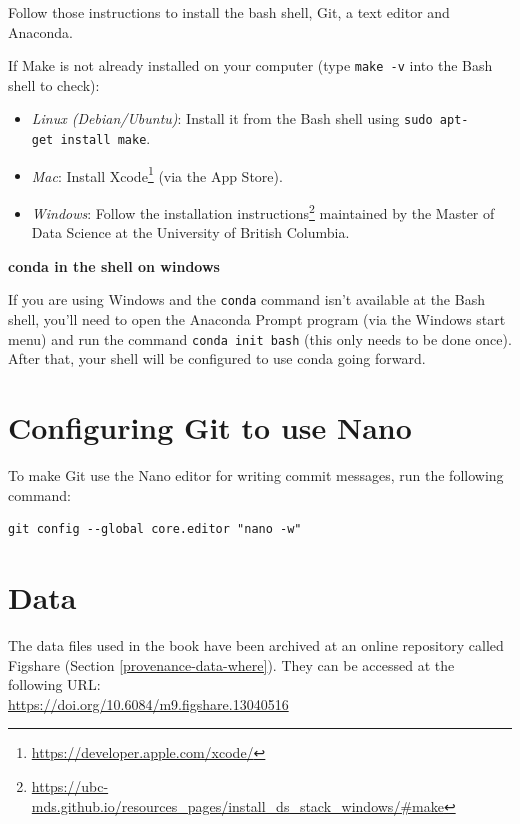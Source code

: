 \documentclass[
]{krantz}
\providecommand{\tightlist}{%
  \setlength{\itemsep}{0pt}\setlength{\parskip}{0pt}}
\renewenvironment{quote}{\begin{VF}}{\end{VF}}
\renewcommand{\href}[2]{#2\footnote{\url{#1}}}
\begin{document}
Follow those instructions to install the bash shell, Git, a text editor and Anaconda.

If Make is not already installed on your computer (type \texttt{make\ -v} into the Bash shell to check):

\begin{itemize}
\tightlist
\item
  \emph{Linux (Debian/Ubuntu)}: Install it from the Bash shell using \texttt{sudo\ apt-get\ install\ make}.
\item
  \emph{Mac}: Install \href{https://developer.apple.com/xcode/}{Xcode} (via the App Store).
\item
  \emph{Windows}: Follow the \href{https://ubc-mds.github.io/resources_pages/install_ds_stack_windows/\#make}{installation instructions} maintained by the
  Master of Data Science at the University of British Columbia.
\end{itemize}

\begin{quote}
\textbf{conda in the shell on windows}

If you are using Windows and the \texttt{conda} command isn't available at the Bash shell,
you'll need to open the Anaconda Prompt program (via the Windows start menu)
and run the command \texttt{conda\ init\ bash} (this only needs to be done once).
After that, your shell will be configured to use conda going forward.
\end{quote}

\hypertarget{install-git-nano}{%
\section{Configuring Git to use Nano}\label{install-git-nano}}

To make Git use the Nano editor for writing commit messages,
run the following command:

\begin{verbatim}
git config --global core.editor "nano -w"
\end{verbatim}

\hypertarget{install-data}{%
\section{Data}\label{install-data}}

The data files used in the book have been archived
at an online repository called Figshare (Section \ref{provenance-data-where}).
They can be accessed at the following URL:\\
\url{https://doi.org/10.6084/m9.figshare.13040516}
\end{document}
